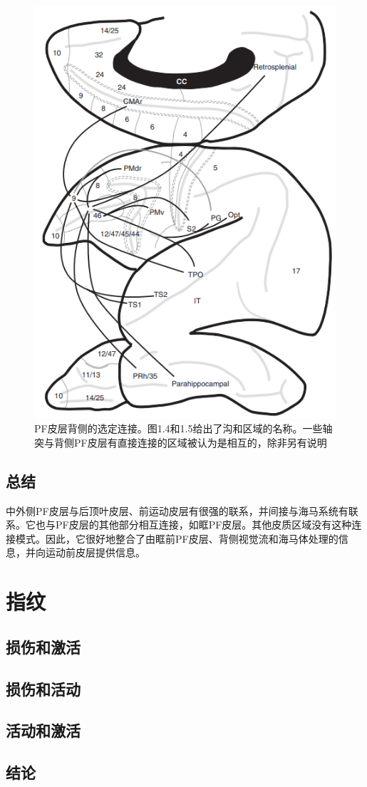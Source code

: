 \begin{figure}
	\centering
	\includegraphics[width=0.7\linewidth]{image_pfc/Fig_6_2}
	\caption{PF皮层背侧的选定连接。图1.4和1.5给出了沟和区域的名称。一些轴突与背侧PF皮层有直接连接的区域被认为是相互的，除非另有说明}
	\label{fig:fig}
\end{figure}

\subsection{总结}
中外侧PF皮层与后顶叶皮层、前运动皮层有很强的联系，并间接与海马系统有联系。它也与PF皮层的其他部分相互连接，如眶PF皮层。其他皮质区域没有这种连接模式。因此，它很好地整合了由眶前PF皮层、背侧视觉流和海马体处理的信息，并向运动前皮层提供信息。

\section{指纹}

\subsection{损伤和激活}

\subsection{损伤和活动}

\subsection{活动和激活}




\subsection{结论}


